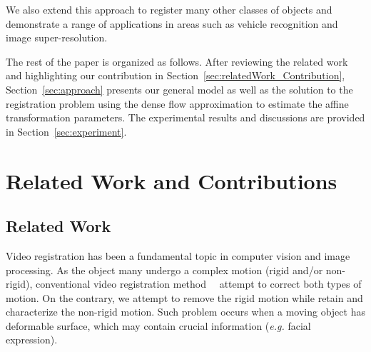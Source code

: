 \documentclass[10pt,journal]{IEEEtran}
\begin{document}
We also extend this approach to register many other classes of objects and demonstrate a range of applications in areas such as vehicle recognition and image super-resolution. 

The rest of the paper is organized as follows. After reviewing the related work and highlighting our contribution in Section~\ref{sec:relatedWork_Contribution}, Section~\ref{sec:approach} presents our general model as well as the solution to the registration problem using the dense flow approximation to estimate the affine transformation parameters. The experimental results and discussions are provided in Section~\ref{sec:experiment}.


\section{\label{sec:relatedWork_Contribution}Related Work and Contributions}

\subsection{\label{sec:related_work}Related Work}

Video registration has been a fundamental topic in computer vision and image processing. As the object many undergo a complex motion (rigid and/or non-rigid), conventional video registration method~\cite{Uenohara95}~\cite{Caspi_PAMI02} attempt to correct both types of motion. On the contrary, we attempt to remove the rigid motion while retain and characterize the non-rigid motion. Such problem occurs when a moving object has deformable surface, which may contain crucial information (\textit{e.g.} facial expression).
\end{document}
